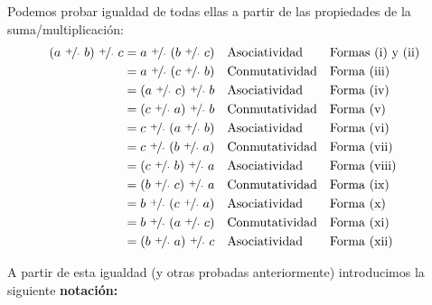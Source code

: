 \documentclass[11pt]{article}
\begin{document}
Podemos probar igualdad de todas ellas a partir de las propiedades de la suma/multiplicación:
\vspace{1em}\begin{align*}
    (a \ \nicefrac{+}{\cdot} \ b) \ \nicefrac{+}{\cdot} \ c &= a \ \nicefrac{+}{\cdot} \ (b \ \nicefrac{+}{\cdot} \ c) && \text{Asociatividad} && \text{Formas (i) y (ii)}\\
    &= a \ \nicefrac{+}{\cdot} \ (c \ \nicefrac{+}{\cdot} \ b) && \text{Conmutatividad} && \text{Forma (iii)}\\
    &= (a \ \nicefrac{+}{\cdot} \ c) \ \nicefrac{+}{\cdot} \ b && \text{Asociatividad} && \text{Forma (iv)}\\
    &= (c \ \nicefrac{+}{\cdot} \ a) \ \nicefrac{+}{\cdot} \ b && \text{Conmutatividad}&& \text{Forma (v)}\\
    &= c \ \nicefrac{+}{\cdot} \ (a \ \nicefrac{+}{\cdot} \ b) && \text{Asociatividad}&& \text{Forma (vi)}\\
    &= c \ \nicefrac{+}{\cdot} \ (b \ \nicefrac{+}{\cdot} \ a) && \text{Conmutatividad}&& \text{Forma (vii)}\\
    &= (c \ \nicefrac{+}{\cdot} \ b) \ \nicefrac{+}{\cdot} \ a && \text{Asociatividad}&& \text{Forma (viii)}\\
    &= (b \ \nicefrac{+}{\cdot} \ c) \ \nicefrac{+}{\cdot} \ a && \text{Conmutatividad}&& \text{Forma (ix)}\\
    &= b \ \nicefrac{+}{\cdot} \ (c \ \nicefrac{+}{\cdot} \ a) && \text{Asociatividad}&& \text{Forma (x)}\\
    &= b \ \nicefrac{+}{\cdot} \ (a \ \nicefrac{+}{\cdot} \ c) && \text{Conmutatividad}&& \text{Forma (xi)}\\
    &= (b \ \nicefrac{+}{\cdot} \ a) \ \nicefrac{+}{\cdot} \ c && \text{Asociatividad}&& \text{Forma (xii)}
\end{align*}

A partir de esta igualdad (y otras probadas anteriormente) introducimos la siguiente \textbf{notación:}
\end{document}
